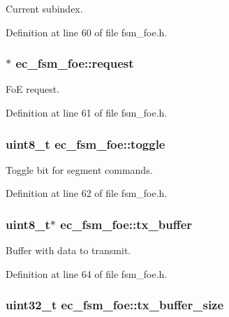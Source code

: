 \-Current subindex. 



\-Definition at line 60 of file fsm\-\_\-foe.\-h.

\subsubsection[{request}]{$\ast$ {\bf ec\-\_\-fsm\-\_\-foe\-::request}}\label{structec__fsm__foe_a000c08fd63b07a083d61a781b68529ee}


\-Fo\-E request. 



\-Definition at line 61 of file fsm\-\_\-foe.\-h.

\subsubsection[{toggle}]{\setlength{\rightskip}{0pt plus 5cm}uint8\-\_\-t {\bf ec\-\_\-fsm\-\_\-foe\-::toggle}}\label{structec__fsm__foe_ae3c3f1d7a1a8637434f33e1de9fb0c01}


\-Toggle bit for segment commands. 



\-Definition at line 62 of file fsm\-\_\-foe.\-h.

\subsubsection[{tx\-\_\-buffer}]{\setlength{\rightskip}{0pt plus 5cm}uint8\-\_\-t$\ast$ {\bf ec\-\_\-fsm\-\_\-foe\-::tx\-\_\-buffer}}\label{structec__fsm__foe_afe4370bcebc74b342e51dc6ec7c167bd}


\-Buffer with data to transmit. 



\-Definition at line 64 of file fsm\-\_\-foe.\-h.

\subsubsection[{tx\-\_\-buffer\-\_\-size}]{\setlength{\rightskip}{0pt plus 5cm}uint32\-\_\-t {\bf ec\-\_\-fsm\-\_\-foe\-::tx\-\_\-buffer\-\_\-size}}\label{structec__fsm__foe_a25f7057a98c25d28cb089b7268cb415d}


